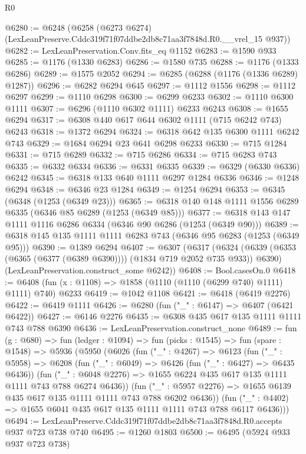 \begin{lexlean}{R0}
\begin{coremodule}
@6280 := @6248
    (@6258 (@6273 @6274) (LexLeanPreserve.Cddc319f71f07ddbe2db8c71aa3f7848d.R0.__vrel_15 @937))
@6282 := LexLeanPreservation.Conv.fits_eq @1152
@6283 := @1590 @933
@6285 := @1176 (@1330 @6283)
@6286 := @1580 @735
@6288 := @1176 (@1333 @6286)
@6289 := @1575 @2052
@6294 := @6285 (@6288 (@1176 (@1336 @6289) @1287))
@6296 := @6282 @6294 @645
@6297 := @1112 @1556
@6298 := @1112 @6297
@6299 := @1110 @6298
@6300 := @6299 @6233
@6302 := @1110 @6300 @1111
@6307 := @6296 (@1110 @6302 @1111) @6233 @6243
@6308 := @1655 @6294
@6317 := @6308 @440 @617 @644 @6302 @1111 (@715 @6242 @743) @6243
@6318 := @1372 @6294
@6324 := @6318 @642 @135 @6300 @1111 @6242 @743
@6329 := @1684 @6294 @23 @641 @6298 @6233
@6330 := @715 @1284
@6331 := @715 @6289
@6332 := @715 @6286
@6334 := @715 @6283 @743
@6335 := @6332 @6334
@6336 := @6331 @6335
@6339 := @6329 (@6330 @6336) @6242
@6345 := @6318 @133 @640 @1111 @6297 @1284 @6336
@6346 := @1248 @6294
@6348 := @6346 @23 @1284
@6349 := @1254 @6294
@6353 := @6345 (@6348 (@1253 (@6349 @23)))
@6365 := @6318 @140 @148 @1111 @1556 @6289 @6335 (@6346 @85 @6289 (@1253 (@6349 @85)))
@6377 := @6318 @143 @147 @1111 @1116 @6286 @6334 (@6346 @90 @6286 (@1253 (@6349 @90)))
@6389 := @6318 @145 @135 @1111 @1111 @6283 @743 (@6346 @95 @6283 (@1253 (@6349 @95)))
@6390 := @1389 @6294
@6407 := @6307
    (@6317
      (@6324 (@6339 (@6353 (@6365 (@6377 (@6389 @6390)))) (@1834 @719 @2052 @735 @933)) @6390)
      (LexLeanPreservation.construct_some @6242))
@6408 := Bool.casesOn.{0}
@6418 := @6408 (fun (x : @1108) => @1858 (@1110 (@1110 (@6299 @740) @1111) @1111) @740) @6233
@6419 := @1042 @1108
@6421 := @6418 (@6419 @2276)
@6422 := @6419 @1111
@6426 := @6280 (fun ("_" : @6147) => @6407 (@6421 @6422))
@6427 := @6146 @2276
@6435 := @6308 @435 @617 @135 @1111 @1111 @743 @788 @6390
@6436 := LexLeanPreservation.construct_none
@6489 := fun (g : @680) =>
  fun (ledger : @1094) =>
  fun (picks : @1545) =>
  fun (spare : @1548) =>
  @5936
    (@5950
      (@6026
        (fun ("_" : @4267) =>
        @6123
          (fun ("_" : @5958) =>
          @6208
            (fun ("_" : @6049) => @6426 (fun ("_" : @6427) => @6435 @6436))
            (fun ("_" : @6048 @2276) =>
            @1655 @6224 @435 @617 @135 @1111 @1111 @743 @788 @6274 @6436))
          (fun ("_" : @5957 @2276) => @1655 @6139 @435 @617 @135 @1111 @1111 @743 @788 @6202 @6436))
        (fun ("_" : @4402) => @1655 @6041 @435 @617 @135 @1111 @1111 @743 @788 @6117 @6436)))
@6494 := LexLeanPreserve.Cddc319f71f07ddbe2db8c71aa3f7848d.R0.accepts @937 @723 @738 @740
@6495 := @1260 @1803
@6500 := @6495 (@5924 @933 @937 @723 @738)

\end{coremodule}
\end{lexlean}
